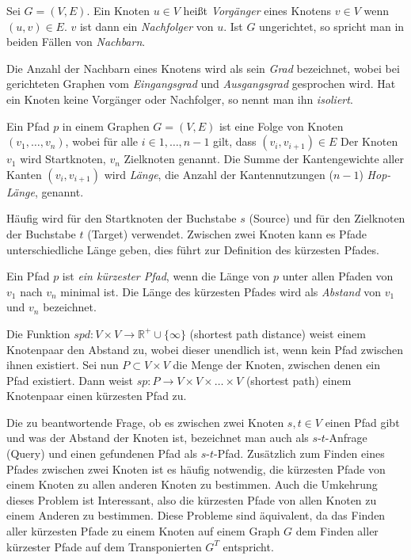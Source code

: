 \begin{definition}[Nachbar]
    Sei $G = (V, E)$. Ein Knoten $u \in V$ heißt \emph{Vorgänger} eines Knotens $v \in V$ wenn $(u, v) \in E$. $v$ ist dann ein \emph{Nachfolger} von $u$.
    Ist $G$ ungerichtet, so spricht man in beiden Fällen von \emph{Nachbarn}.
\end{definition}

Die Anzahl der Nachbarn eines Knotens wird als sein \emph{Grad} bezeichnet, wobei bei gerichteten Graphen vom \emph{Eingangsgrad} und \emph{Ausgangsgrad} gesprochen wird.
Hat ein Knoten keine Vorgänger oder Nachfolger, so nennt man ihn \emph{isoliert}.

\begin{definition}[Pfad]
    Ein Pfad $p$ in einem Graphen $G = (V, E)$ ist eine Folge von Knoten $(v_1, \dotsc, v_n)$, wobei für alle $i \in {1, \dotsc, n-1}$ gilt, dass $(v_i, v_{i+1}) \in E$
    Der Knoten $v_1$ wird Startknoten, $v_n$ Zielknoten genannt.
    Die Summe der Kantengewichte aller Kanten $(v_i, v_{i + 1})$ wird \emph{Länge}, die Anzahl der Kantennutzungen ($n - 1$) \emph{Hop-Länge}, genannt.
\end{definition}

Häufig wird für den Startknoten der Buchstabe $s$ (Source) und für den Zielknoten der Buchstabe $t$ (Target) verwendet.
Zwischen zwei Knoten kann es Pfade unterschiedliche Länge geben, dies führt zur Definition des kürzesten Pfades.

\begin{definition}
    Ein Pfad $p$ ist \emph{ein kürzester Pfad}, wenn die Länge von $p$ unter allen Pfaden von $v_1$ nach $v_n$ minimal ist.
    Die Länge des kürzesten Pfades wird als \emph{Abstand} von $v_1$ und $v_n$ bezeichnet.

    Die Funktion ${spd} \colon V \times V \to \mathbb{R}^+ \cup \{ \infty \} $ (shortest path distance) weist einem Knotenpaar den Abstand zu, wobei dieser unendlich ist, wenn kein Pfad zwischen ihnen existiert.
    Sei nun $P \subset V \times V$ die Menge der Knoten, zwischen denen ein Pfad existiert.
    Dann weist ${sp} \colon P \to V \times V \times \dots \times V$ (shortest path) einem Knotenpaar einen kürzesten Pfad zu.
\end{definition}

Die zu beantwortende Frage, ob es zwischen zwei Knoten $s, t \in V$ einen Pfad gibt und was der Abstand der Knoten ist, bezeichnet man auch als $s$-$t$-Anfrage (Query) und einen gefundenen Pfad als $s$-$t$-Pfad.
Zusätzlich zum Finden eines Pfades zwischen zwei Knoten ist es häufig notwendig, die kürzesten Pfade von einem Knoten zu allen anderen Knoten zu bestimmen.
Auch die Umkehrung dieses Problem ist Interessant, also die kürzesten Pfade von allen Knoten zu einem Anderen zu bestimmen.
Diese Probleme sind äquivalent, da das Finden aller kürzesten Pfade zu einem Knoten auf einem Graph $G$ dem Finden aller kürzester Pfade auf dem Transponierten $G^T$ entspricht.

